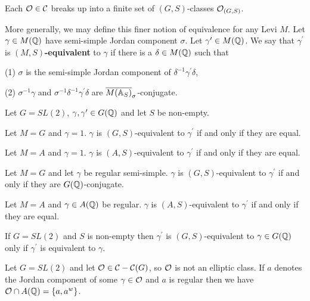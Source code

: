 \begin{lemma}
Each ${\cal{O}}\in {\cal{C}}$ breaks up into a finite set of
$(G,S)$-classes ${\cal{O}}_{(G,S)}$.
\end{lemma}

More generally, we may define this
finer notion of equivalence for any Levi $M$. Let
$\gamma \in M({\Bbb{Q}})$ have semi-simple Jordan
component $\sigma$. Let $\gamma ^{\prime }\in M({\Bbb{Q}})$.
We say that $\gamma ^{\prime }$
is $(M,S)${\bf -equivalent} to $\gamma $ if there is a
$\delta \in M({\Bbb{Q}})$ such that

(1) $\sigma $ is the semi-simple Jordan component of
$\delta ^{-1}\gamma^{\prime }\delta $,

(2) $\sigma ^{-1}\gamma $ and $\sigma ^{-1}\delta ^{-1}
\gamma ^{\prime}\delta $ are
$\overline{M({\Bbb{A}}_{S})}_\sigma$-conjugate.

\begin{example}
Let $G=SL(2)$, $\gamma,\gamma^{\prime}\in G({\Bbb{Q}})$
and let $S$ be non-empty.

Let $M=G$ and $\gamma =1$. $\gamma$ is $(G,S)$-equivalent to
$\gamma^{\prime}$ if and only if they are equal.

Let $M=A$ and $\gamma =1$. $\gamma$ is $(A,S)$-equivalent to
$\gamma^{\prime}$ if and only if they are equal.

Let $M=G$ and let $\gamma $ be regular semi-simple.
$\gamma$ is $(G,S)$-equivalent to
$\gamma^{\prime}$ if and only if they are $G({\Bbb{Q}})$-conjugate.

Let $M=A$ and $\gamma \in A({\Bbb{Q}})$ be regular.
$\gamma$ is $(A,S)$-equivalent to
$\gamma^{\prime}$ if and only if they are equal.
\end{example}

\begin{lemma}
If $G=SL(2)$ and $S$ is non-empty then
$\gamma^{\prime}$ is $(G,S)$-equivalent to $\gamma\in G({\Bbb{Q}})$ only if 
$\gamma^{\prime}$ is equivalent to $\gamma$.
\end{lemma}

\begin{example}
Let $G=SL(2)$ and let ${\cal{O}}\in {\cal C}-{\cal C}(G)$, so
${\cal{O}}$ is not an elliptic class. If $a$ denotes the Jordan component of
some $\gamma \in {\cal{O}}$ and $a$ is regular then we have
${\cal{O}}\cap A({\Bbb{Q}})=\{a,a^w\}$.
\end{example}

